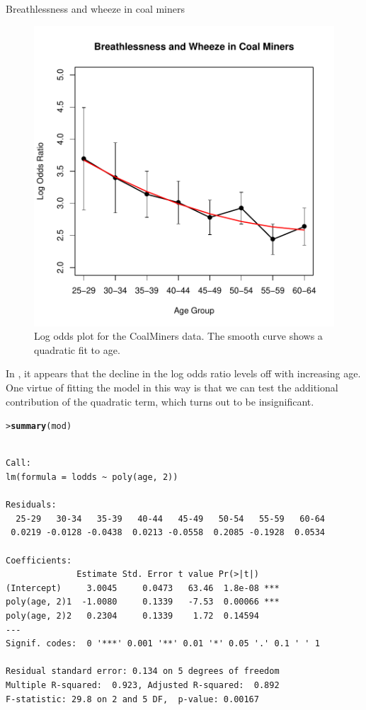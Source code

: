 \documentclass[10pt,krantz2]{krantz}\usepackage[]{graphicx}\usepackage[]{color}
\makeatletter
\newcommand{\hlstd}[1]{\textcolor[rgb]{0.345,0.345,0.345}{#1}}%
\newcommand{\hlkwd}[1]{\textcolor[rgb]{0.737,0.353,0.396}{\textbf{#1}}}%
\newenvironment{kframe}{%
 \def\at@end@of@kframe{}%
 \ifinner\ifhmode%
  \def\at@end@of@kframe{\end{minipage}}%
  \begin{minipage}{\columnwidth}%
 \fi\fi%
 \def\FrameCommand##1{\hskip\@totalleftmargin \hskip-\fboxsep
 \colorbox{shadecolor}{##1}\hskip-\fboxsep
     \hskip-\linewidth \hskip-\@totalleftmargin \hskip\columnwidth}%
 \MakeFramed {\advance\hsize-\width
   \@totalleftmargin\z@ \linewidth\hsize
   \@setminipage}}%
 {\par\unskip\endMakeFramed%
 \at@end@of@kframe}
\newenvironment{knitrout}{}{} %
\renewenvironment{knitrout}{\small\renewcommand{\baselinestretch}{.85}}{} %
\makeatother
\begin{document}
\begin{Example}[wheeze1]{Breathlessness and wheeze in coal miners}
\begin{knitrout}
\begin{figure}[!htbp]
\centerline{\includegraphics[width=.6\textwidth]{ch04/fig/coalminer3-1} }

\caption[Log odds plot for the CoalMiners data]{Log odds plot for the CoalMiners data.  The smooth curve shows a quadratic fit to age.\label{fig:coalminer3}}
\end{figure}


\end{knitrout}
In , it appears that the decline in the
log odds ratio levels off with increasing age.  One virtue of
fitting the model in this way is that we can test the additional contribution
of the quadratic term, which turns out to be insignificant.
\begin{knitrout}
\color{fgcolor}\begin{kframe}
\begin{alltt}
\hlstd{> }\hlkwd{summary}\hlstd{(mod)}
\end{alltt}
\begin{verbatim}

Call:
lm(formula = lodds ~ poly(age, 2))

Residuals:
  25-29   30-34   35-39   40-44   45-49   50-54   55-59   60-64 
 0.0219 -0.0128 -0.0438  0.0213 -0.0558  0.2085 -0.1928  0.0534 

Coefficients:
              Estimate Std. Error t value Pr(>|t|)    
(Intercept)     3.0045     0.0473   63.46  1.8e-08 ***
poly(age, 2)1  -1.0080     0.1339   -7.53  0.00066 ***
poly(age, 2)2   0.2304     0.1339    1.72  0.14594    
---
Signif. codes:  0 '***' 0.001 '**' 0.01 '*' 0.05 '.' 0.1 ' ' 1

Residual standard error: 0.134 on 5 degrees of freedom
Multiple R-squared:  0.923,	Adjusted R-squared:  0.892 
F-statistic: 29.8 on 2 and 5 DF,  p-value: 0.00167
\end{verbatim}
\end{kframe}
\end{knitrout}

\end{Example}
\end{document}
